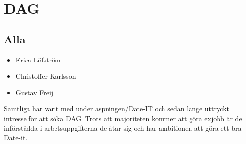 \section{DAG}
\subsection{Alla}

\begin{autoframe}
\begin{itemize}
\item Erica Löfström
\item Christoffer Karlsson
\item Gustav Freij
\end{itemize}


\bigskip
Samtliga har varit med under aspningen/Date-IT och sedan länge uttryckt intresse för att söka DAG. Trots att majoriteten kommer att göra exjobb är de införstådda i arbetsuppgifterna de åtar sig och har ambitionen att göra ett bra Date-it. 
\end{autoframe}
